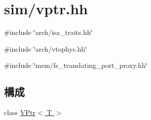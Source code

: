 \hypertarget{vptr_8hh}{
\section{sim/vptr.hh}
\label{vptr_8hh}
}
{\ttfamily \#include \char`\"{}arch/isa\_\-traits.hh\char`\"{}}\par
{\ttfamily \#include \char`\"{}arch/vtophys.hh\char`\"{}}\par
{\ttfamily \#include \char`\"{}mem/fs\_\-translating\_\-port\_\-proxy.hh\char`\"{}}\par
\subsection*{構成}
\begin{DoxyCompactItemize}
\item 
class \hyperlink{classVPtr}{VPtr$<$ T $>$}
\end{DoxyCompactItemize}
